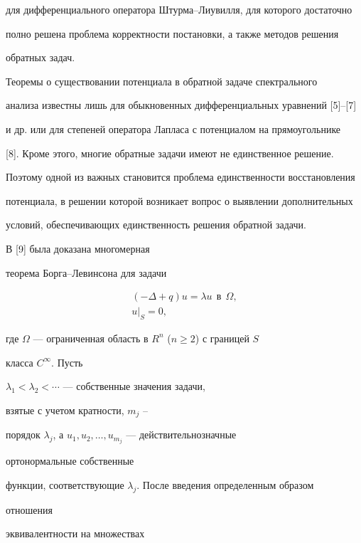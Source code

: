 для дифференциального оператора Штурма--Лиувилля, для которого достаточно 


полно решена проблема корректности постановки, а также методов решения 


обратных задач. 


 


Теоремы о существовании потенциала в обратной задаче спектрального 


анализа известны лишь для обыкновенных дифференциальных уравнений [5]--[7] 


и др. или для степеней оператора Лапласа с потенциалом на прямоугольнике 


[8]. Кроме этого, многие обратные задачи имеют не единственное решение. 


Поэтому одной из важных становится проблема единственности восстановления 


потенциала, в решении которой возникает вопрос о выявлении дополнительных 


условий, обеспечивающих единственность решения обратной задачи. 


 


В [9] была доказана многомерная 


теорема Борга--Левинсона для задачи 


\begin{gather*} 


(-\Delta+q)u=\lambda u\ \ \text{в}\ \ \Omega, \\ 


u|_S=0, 


\end{gather*} 


где $\Omega$ --- ограниченная область в $R^n$ ($n\ge2$) с границей $S$ 


класса $C^\infty$. Пусть 


$\lambda_1<\lambda_2<\dotsb$ --- собственные значения задачи, 


взятые с учетом кратности, $m_j$ -- 


порядок $\lambda_j$, а $u_1,u_2,\dotsc,u_{m_j}$ --- действительнозначные 


ортонормальные собственные 


функции, соответствующие $\lambda_j$. После введения определенным образом 


отношения 


эквивалентности на множествах 


$$ 


